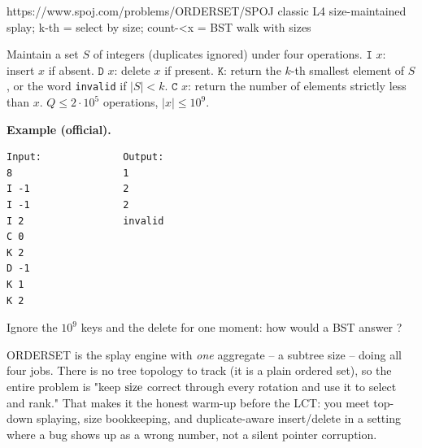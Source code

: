   {https://www.spoj.com/problems/ORDERSET/}{SPOJ classic L4}
  {size-maintained splay; k-th = select by size; count-<x = BST walk with sizes}

\begin{problemstatement}
Maintain a set \(S\) of integers (duplicates ignored) under four operations.
\(\texttt{I }x\): insert \(x\) if absent. \(\texttt{D }x\): delete \(x\) if present.
\(\texttt{K}\): return the \(k\)-th smallest element of \(S\), or the word
\texttt{invalid} if \(|S|<k\). \(\texttt{C }x\): return the number of elements
strictly less than \(x\). \(Q\le 2\cdot 10^5\) operations, \(|x|\le 10^9\).

\textbf{Example (official).}
\begin{verbatim}
Input:              Output:
8                   1
I -1                2
I -1                2
I 2                 invalid
C 0
K 2
D -1
K 1
K 2
\end{verbatim}
\end{problemstatement}

\begin{attemptgate}
Ignore the \(10^9\) keys and the delete for one moment: how would a BST answer
? 
\end{attemptgate}

ORDERSET is the splay engine with \emph{one} aggregate -- a subtree size -- doing all
four jobs. There is no tree topology to track (it is a plain ordered set), so the
entire problem is "keep \(\operatorname{size}\) correct through every rotation and use it to select
and rank." That makes it the honest warm-up before the LCT: you meet top-down
splaying, size bookkeeping, and duplicate-aware insert/delete in a setting where a
bug shows up as a wrong number, not a silent pointer corruption.

